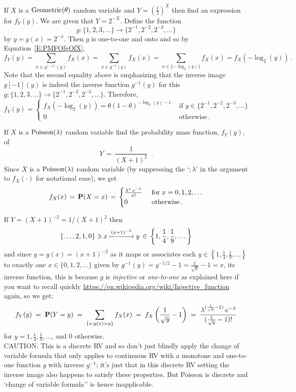 \begin{ExerciseList}
\Exercise
If $X$ is a $\mbox{{\rm Geometric}}(\theta)$ random variable and $Y=\left(\frac{1}{2}\right)^X$ then find an expression for $f_Y(y)$.
\Answer
We are given that $Y=2^{-X}$. Define the function
$$g: \{1,2,3,\ldots\} \to \{2^{-1},2^{-2},2^{-3},\ldots\}$$
by $y=g(x)=2^{-x}$.  Then $g$ is one-to-one and onto and so by Equation~\eqref{E:PMFOfgOfX},
\[
f_Y(y) = \sum_{x \in g^{[-1]}(y)} f_X(x) = \sum_{x \in g^{-1}(y)} f_X(x) = \sum_{x \in \{ -\log_2(y) \} } f_X(x) = f_X(-\log_2(y))\, .
\]
Note that the second equality above is emphasizing that the inverse image $g{[-1]}(y)$ is indeed the inverse function $g^{-1}(y)$ for this $g:\{1,2,3,\ldots\} \to \{2^{-1},2^{-2},2^{-3},\ldots\}$.  Therefore,
\[
f_Y(y) = 
\begin{cases}
f_X(-\log_2(y)) = \theta (1-\theta)^{-\log_2(y)-1} & \text{ if } y \in \{2^{-1},2^{-2},2^{-3},\ldots\}\\
0 & \text{ otherwise} \, .
\end{cases}
\]


\Exercise
If $X$ is a $\mbox{{\rm Poisson}}(\lambda)$ random variable find the probability mass function,  $f_Y (y)$, of
\[
Y\,=\,\frac{1}{(X+1)^{2}} \enspace .
\]
\Answer
Since $X$ is a $\mbox{{\rm Poisson}}(\lambda)$ random variable (by suppressing the `$;\lambda$' in the argument to $f_X(\cdot)$ for notational ease), we get
\[ f_X(x) \,=\, \mathbf{P}(X=x)\,=\, 
\begin{cases}
\frac{\lambda^x \, e^{-\lambda} }{ x!} & \text{ for }  x= 0, 1, 2, \dots \\
0 & \text{ otherwise} \,.
\end{cases}
\]

If $Y=(X+1)^{-2}=1/(X+1)^2$ then  \[ \{\ldots,2,1,0\} \ni x \xmapsto{(x+1)^{-2}} y \,\in\, \left\{1, \frac{1}{4}, \frac{1}{9}, \dots \right\} \]
and since $y=g(x)=(x+1)^{-2}$ {\scriptsize as it maps or associates each $y \in \left\{1, \frac{1}{4}, \frac{1}{9}, \dots \right\}$ to exactly one $x \in \{0,1,2,\ldots\}$ given by $g^{-1}(y)=y^{-1/2}-1 = \frac{1}{\sqrt{y}}-1= x$, its inverse function, this is because $g$ is {\em injective} or {\em one-to-one} as explained here if you want to recall quickly \url{https://en.wikipedia.org/wiki/Injective_function} again}, so we get:
\[
f_Y(y)\;=\; \mathbf{P}(Y=y)\;=\; \sum_{\{ x: g(x)=y\}}f_X(x)  \;=\; f_X\left( \frac{1}{\sqrt y}-1\right) \;=\; \frac{\lambda^{(\frac{1}{\sqrt y} -1)} \, e^{-\lambda}}{(\frac{1}{\sqrt y} -1)!}
\]
for $y = 1, \frac{1}{4}, \frac{1}{9}, \dots $, and $0$ otherwise.\\[4pt]
{\scriptsize CAUTION: This is a discrete RV and so don't just blindly apply the change of variable formula that only applies to continuous RV with a monotone and one-to-one function 
$g$ with inverse $g^{-1}$; it's just that in this discrete RV setting the inverse image also happens to satisfy these properties. But Poisson is discrete and `change of variable formula'' is hence inapplicable.}


\end{ExerciseList}
